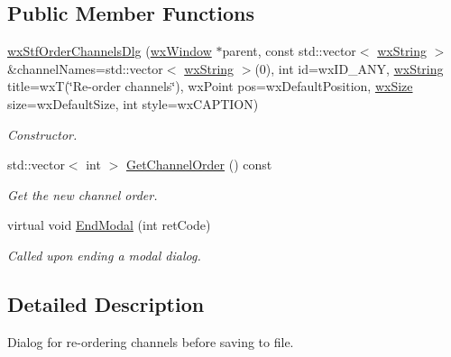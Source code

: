 \subsection*{Public Member Functions}
\begin{DoxyCompactItemize}
\item 
\hyperlink{classwxStfOrderChannelsDlg_a1dc014da4bc15dfeeb465ed9a570b678}{wxStfOrderChannelsDlg} (\hyperlink{classwxWindow}{wxWindow} $\ast$parent, const std::vector$<$ \hyperlink{classwxString}{wxString} $>$ \&channelNames=std::vector$<$ \hyperlink{classwxString}{wxString} $>$(0), int id=wxID\_\-ANY, \hyperlink{classwxString}{wxString} title=wxT(\char`\"{}Re-\/order channels\char`\"{}), wxPoint pos=wxDefaultPosition, \hyperlink{classwxSize}{wxSize} size=wxDefaultSize, int style=wxCAPTION)
\begin{DoxyCompactList}\small\item\em Constructor. \item\end{DoxyCompactList}\item 
std::vector$<$ int $>$ \hyperlink{classwxStfOrderChannelsDlg_ae900554d1f021984ace1d6a4e6d9b9ab}{GetChannelOrder} () const 
\begin{DoxyCompactList}\small\item\em Get the new channel order. \item\end{DoxyCompactList}\item 
virtual void \hyperlink{classwxStfOrderChannelsDlg_a9b61a24f52239352bfd3d38edd26f4f3}{EndModal} (int retCode)
\begin{DoxyCompactList}\small\item\em Called upon ending a modal dialog. \item\end{DoxyCompactList}\end{DoxyCompactItemize}


\subsection{Detailed Description}
Dialog for re-\/ordering channels before saving to file. 

